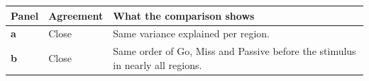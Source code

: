 \begin{longtable}{@{}p{1.1cm}p{2.5cm}p{11.8cm}@{}}
\toprule
Panel & Agreement & What the comparison shows \\
\midrule
\endhead
\textbf{a} & Close & Same variance explained per region. \\
\textbf{b} & Close & Same order of Go, Miss and Passive before the stimulus in nearly all regions. \\
\bottomrule
\end{longtable}
